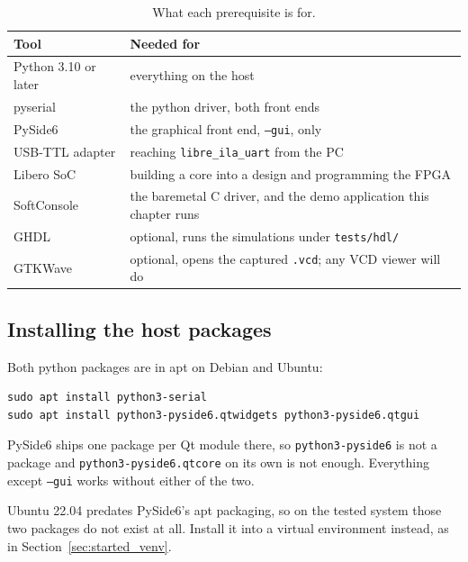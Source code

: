\documentclass[../manual.tex]{subfiles}
\begin{document}
\begin{table}[H]
    \centering
    \begin{tabularx}{\textwidth}{|l|X|}
        \hline
        \rowcolor{gray!40} \textbf{Tool} & \textbf{Needed for} \\
        \hline
        Python 3.10 or later & everything on the host \\
        \hline
        pyserial & the python driver, both front ends \\
        \hline
        PySide6 & the graphical front end, \texttt{--gui}, only \\
        \hline
        USB-TTL adapter & reaching \texttt{libre\_ila\_uart} from the PC \\
        \hline
        Libero SoC & building a core into a design and programming the FPGA \\
        \hline
        SoftConsole & the baremetal C driver, and the demo application this chapter runs \\
        \hline
        GHDL & optional, runs the simulations under \texttt{tests/hdl/} \\
        \hline
        GTKWave & optional, opens the captured \texttt{.vcd}; any VCD viewer will do \\
        \hline
    \end{tabularx}
    \caption{What each prerequisite is for.}
    \label{tab:started_prereq}
\end{table}

\subsection{Installing the host packages}
\label{sec:started_hostpkgs}

Both python packages are in apt on Debian and Ubuntu:

\begin{lstlisting}
sudo apt install python3-serial
sudo apt install python3-pyside6.qtwidgets python3-pyside6.qtgui
\end{lstlisting}

PySide6 ships one package per Qt module there, so \texttt{python3-pyside6} is not a package and \texttt{python3-pyside6.qtcore} on its own is not enough. Everything except \texttt{--gui} works without either of the two.

Ubuntu 22.04 predates PySide6's apt packaging, so on the tested system those two packages do not exist at all. Install it into a virtual environment instead, as in Section~\ref{sec:started_venv}.
\end{document}
